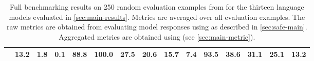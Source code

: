\begin{table}[ht]
{\begin{tabular}{l | ccc | c ccccc | ccccc }
            \ulmlit{} & 13.2 & 1.8 & 0.1 & 88.8 & 100.0 & 27.5 & 20.6 & 15.7 & 7.4 & 93.5 & 38.6 & 31.1 & 25.1 & 13.2 \\
        \bottomrule
    \end{tabular}
    }
    \caption{
        Full benchmarking results on 250 random evaluation examples from \longfactobjects{} for the thirteen language models evaluated in \cref{sec:main-results}.
        Metrics are averaged over all evaluation examples.
        The raw metrics are obtained from evaluating model responses using \safe{} as described in \cref{sec:safe-main}.
        Aggregated metrics are obtained using \metric{} (see \cref{sec:main-metric}).
    }
    \label{tab:full-benchmark-results}
\end{table}